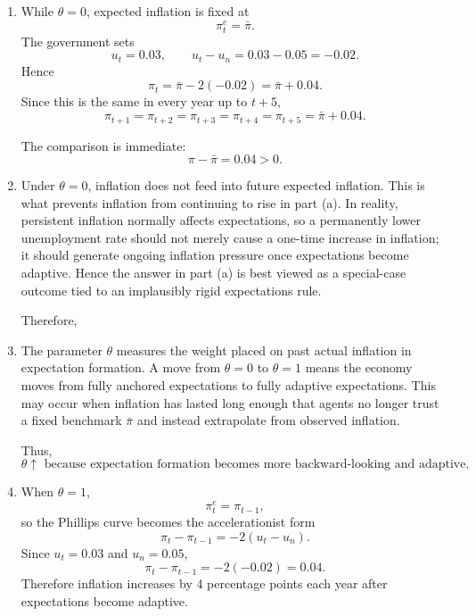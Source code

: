\documentclass[12pt]{article}
\begin{document}
\begin{enumerate}[label=(\alph*)]
    \item
    While \(\theta=0\), expected inflation is fixed at
    \[
    \pi_t^e=\bar{\pi}.
    \]
    The government sets
    \[
    u_t=0.03,
    \qquad
    u_t-u_n=0.03-0.05=-0.02.
    \]
    Hence
    \[
    \pi_t=\bar{\pi}-2(-0.02)=\bar{\pi}+0.04.
    \]
    Since this is the same in every year up to \(t+5\),
    \[
    \boxed{\pi_{t+1}=\pi_{t+2}=\pi_{t+3}=\pi_{t+4}=\pi_{t+5}=\bar{\pi}+0.04.}
    \]

    The comparison is immediate:
    \[
    \boxed{\pi-\bar{\pi}=0.04>0.}
    \]

    \item
    Under \(\theta=0\), inflation does not feed into future expected inflation. This is what prevents inflation from continuing to rise in part (a). In reality, persistent inflation normally affects expectations, so a permanently lower unemployment rate should not merely cause a one-time increase in inflation; it should generate ongoing inflation pressure once expectations become adaptive. Hence the answer in part (a) is best viewed as a special-case outcome tied to an implausibly rigid expectations rule.

    Therefore,
    \begin{center}
    \end{center}

    \item
    The parameter \(\theta\) measures the weight placed on past actual inflation in expectation formation. A move from \(\theta=0\) to \(\theta=1\) means the economy moves from fully anchored expectations to fully adaptive expectations. This may occur when inflation has lasted long enough that agents no longer trust a fixed benchmark \(\bar{\pi}\) and instead extrapolate from observed inflation.

    Thus,
    \[
    \boxed{\theta \uparrow \text{ because expectation formation becomes more backward-looking and adaptive.}}
    \]

    \item
    When \(\theta=1\),
    \[
    \pi_t^e=\pi_{t-1},
    \]
    so the Phillips curve becomes the accelerationist form
    \[
    \pi_t-\pi_{t-1}=-2(u_t-u_n).
    \]
    Since \(u_t=0.03\) and \(u_n=0.05\),
    \[
    \pi_t-\pi_{t-1}=-2(-0.02)=0.04.
    \]
    Therefore inflation increases by 4 percentage points each year after expectations become adaptive.


\end{enumerate}
\end{document}
